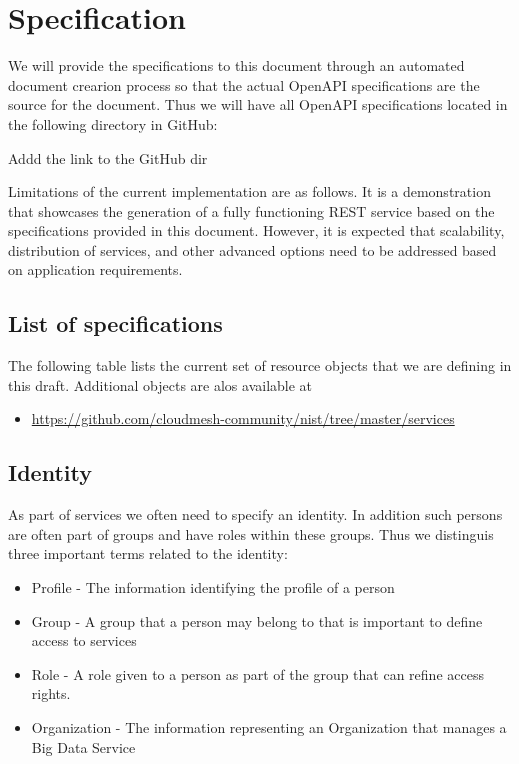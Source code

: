 \documentclass[9pt,]{article}
\newenvironment{Shaded}{}{}
\newcommand{\ExtensionTok}[1]{#1}
\newcommand{\NormalTok}[1]{#1}
\providecommand{\tightlist}{%
  \setlength{\itemsep}{0pt}\setlength{\parskip}{0pt}}
\begin{document}
\hypertarget{specification}{%
\section{Specification}\label{specification}}

We will provide the specifications to this document through an automated
document crearion process so that the actual OpenAPI specifications are
the source for the document. Thus we will have all OpenAPI
specifications located in the following directory in GitHub:

\begin{Shaded}
\begin{Highlighting}[]
\ExtensionTok{Addd}\NormalTok{ the link to the GitHub dir}
\end{Highlighting}
\end{Shaded}

Limitations of the current implementation are as follows. It is a
demonstration that showcases the generation of a fully functioning REST
service based on the specifications provided in this document. However,
it is expected that scalability, distribution of services, and other
advanced options need to be addressed based on application requirements.

\hypertarget{list-of-specifications}{%
\subsection{List of specifications}\label{list-of-specifications}}

The following table lists the current set of resource objects that we
are defining in this draft. Additional objects are alos available at

\begin{itemize}
\tightlist
\item
  \url{https://github.com/cloudmesh-community/nist/tree/master/services}
\end{itemize}

\hypertarget{identity}{%
\subsection{Identity}\label{identity}}

As part of services we often need to specify an identity. In addition
such persons are often part of groups and have roles within these
groups. Thus we distinguis three important terms related to the
identity:

\begin{itemize}
\tightlist
\item
  Profile - The information identifying the profile of a person
\item
  Group - A group that a person may belong to that is important to
  define access to services
\item
  Role - A role given to a person as part of the group that can refine
  access rights.
\item
  Organization - The information representing an Organization that
  manages a Big Data Service
\end{itemize}
\end{document}
